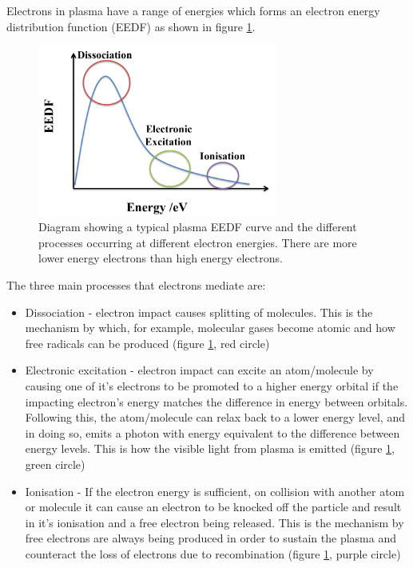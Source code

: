 \documentclass[11pt, oneside]{article}   	%
\begin{document}
Electrons in plasma have a range of energies which forms an electron energy distribution function (EEDF) as shown in figure \ref{fig:EEDF}.

\begin{figure}
	\centering
	\includegraphics[width=0.7\textwidth]{Figures/EEDF}
	\caption{Diagram showing a typical plasma EEDF curve and the different processes occurring at different electron energies. There are more lower energy electrons than high energy electrons.}
	\label{fig:EEDF}
\end{figure}

The three main processes that electrons mediate are:
\begin{itemize}
\item Dissociation - electron impact causes splitting of molecules. This is the mechanism by which, for example, molecular gases become atomic and how free radicals can be produced (figure \ref{fig:EEDF}, red circle)
\item Electronic excitation - electron impact can excite an atom/molecule by causing one of it's electrons to be promoted to a higher energy orbital if the impacting electron's energy matches the difference in energy between orbitals. Following this, the atom/molecule can relax back to a lower energy level, and in doing so, emits a photon with energy equivalent to the difference between energy levels. This is how the visible light from plasma is emitted (figure \ref{fig:EEDF}, green circle)
\item Ionisation - If the electron energy is sufficient, on collision with another atom or molecule it can cause an electron to be knocked off the particle and result in it's ionisation and a free electron being released. This is the mechanism by free electrons are always being produced in order to sustain the plasma and counteract the loss of electrons due to recombination (figure \ref{fig:EEDF}, purple circle)
\end{itemize}
\end{document}
